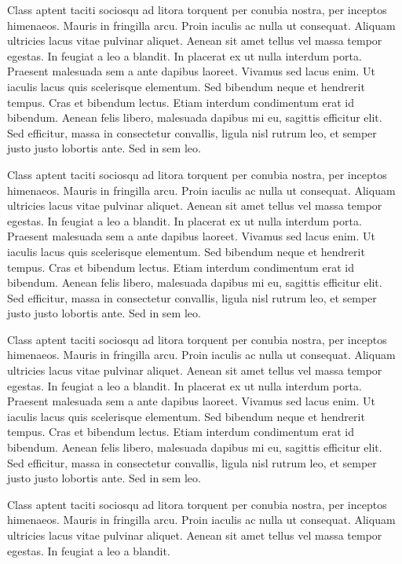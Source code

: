\documentclass{article}
\begin{document}
\vspace{5mm}
Class aptent taciti sociosqu ad litora torquent per conubia nostra, per inceptos himenaeos. Mauris in fringilla arcu. Proin iaculis ac nulla ut consequat. Aliquam ultricies lacus vitae pulvinar aliquet. Aenean sit amet tellus vel massa tempor egestas. In feugiat a leo a blandit. In placerat ex ut nulla interdum porta. Praesent malesuada sem a ante dapibus laoreet. Vivamus sed lacus enim. Ut iaculis lacus quis scelerisque elementum. Sed bibendum neque et hendrerit tempus. Cras et bibendum lectus. Etiam interdum condimentum erat id bibendum. Aenean felis libero, malesuada dapibus mi eu, sagittis efficitur elit. Sed efficitur, massa in consectetur convallis, ligula nisl rutrum leo, et semper justo justo lobortis ante. Sed in sem leo.

\vspace{5mm}
Class aptent taciti sociosqu ad litora torquent per conubia nostra, per inceptos himenaeos. Mauris in fringilla arcu. Proin iaculis ac nulla ut consequat. Aliquam ultricies lacus vitae pulvinar aliquet. Aenean sit amet tellus vel massa tempor egestas. In feugiat a leo a blandit. In placerat ex ut nulla interdum porta. Praesent malesuada sem a ante dapibus laoreet. Vivamus sed lacus enim. Ut iaculis lacus quis scelerisque elementum. Sed bibendum neque et hendrerit tempus. Cras et bibendum lectus. Etiam interdum condimentum erat id bibendum. Aenean felis libero, malesuada dapibus mi eu, sagittis efficitur elit. Sed efficitur, massa in consectetur convallis, ligula nisl rutrum leo, et semper justo justo lobortis ante. Sed in sem leo.

\vspace{5mm}
Class aptent taciti sociosqu ad litora torquent per conubia nostra, per inceptos himenaeos. Mauris in fringilla arcu. Proin iaculis ac nulla ut consequat. Aliquam ultricies lacus vitae pulvinar aliquet. Aenean sit amet tellus vel massa tempor egestas. In feugiat a leo a blandit. In placerat ex ut nulla interdum porta. Praesent malesuada sem a ante dapibus laoreet. Vivamus sed lacus enim. Ut iaculis lacus quis scelerisque elementum. Sed bibendum neque et hendrerit tempus. Cras et bibendum lectus. Etiam interdum condimentum erat id bibendum. Aenean felis libero, malesuada dapibus mi eu, sagittis efficitur elit. Sed efficitur, massa in consectetur convallis, ligula nisl rutrum leo, et semper justo justo lobortis ante. Sed in sem leo.

\vspace{5mm}
Class aptent taciti sociosqu ad litora torquent per conubia nostra, per inceptos himenaeos. Mauris in fringilla arcu. Proin iaculis ac nulla ut consequat. Aliquam ultricies lacus vitae pulvinar aliquet. Aenean sit amet tellus vel massa tempor egestas. In feugiat a leo a blandit. 
\end{document}
